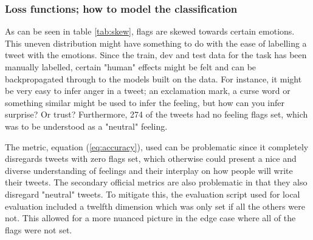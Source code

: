 \subsubsection{Loss functions; how to model the classification} \label{sec:lossdiscussion}
As can be seen in table \ref{tab:skew}, flags are skewed towards certain emotions. This uneven distribution might have something to do with the ease of labelling a tweet with the emotions. Since the train, dev and test data for the task has been manually labelled, certain "human" effects might be felt and can be backpropagated through to the models built on the data. For instance, it might be very easy to infer anger in a tweet; an exclamation mark, a curse word or something similar might be used to infer the feeling, but how can you infer surprise? Or trust? Furthermore, 274 of the tweets had no feeling flags set, which was to be understood as a "neutral" feeling.\\
\begin{table}[H]
\caption{The actual flags set and percentage of the full classification dataset}
\label{tab:skew}
\end{table}
The metric, equation (\ref{eq:accuracy}), used can be problematic since it completely disregards tweets with zero flags set, which otherwise could present a nice and diverse understanding of feelings and their interplay on how people will write their tweets. The secondary official metrics are also problematic in that they also disregard "neutral" tweets. To mitigate this, the evaluation script used for local evaluation included a twelfth dimension which was only set if all the others were not. This allowed for a more nuanced picture in the edge case where all of the flags were not set.

